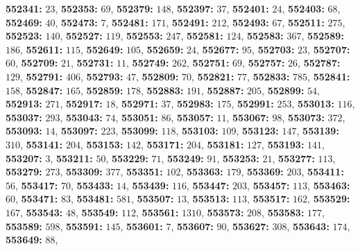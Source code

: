 \textsf{\bfseries 552341:} $23$, \textsf{\bfseries 552353:} $69$, \textsf{\bfseries 552379:} $148$, \textsf{\bfseries 552397:} $37$, \textsf{\bfseries 552401:} $24$, \textsf{\bfseries 552403:} $68$, \textsf{\bfseries 552469:} $40$, \textsf{\bfseries 552473:} $7$, \textsf{\bfseries 552481:} $171$, \textsf{\bfseries 552491:} $212$, \textsf{\bfseries 552493:} $67$, \textsf{\bfseries 552511:} $275$, \textsf{\bfseries 552523:} $140$, \textsf{\bfseries 552527:} $119$, \textsf{\bfseries 552553:} $247$, \textsf{\bfseries 552581:} $124$, \textsf{\bfseries 552583:} $367$, \textsf{\bfseries 552589:} $186$, \textsf{\bfseries 552611:} $115$, \textsf{\bfseries 552649:} $105$, \textsf{\bfseries 552659:} $24$, \textsf{\bfseries 552677:} $95$, \textsf{\bfseries 552703:} $23$, \textsf{\bfseries 552707:} $60$, \textsf{\bfseries 552709:} $21$, \textsf{\bfseries 552731:} $11$, \textsf{\bfseries 552749:} $262$, \textsf{\bfseries 552751:} $69$, \textsf{\bfseries 552757:} $26$, \textsf{\bfseries 552787:} $129$, \textsf{\bfseries 552791:} $406$, \textsf{\bfseries 552793:} $47$, \textsf{\bfseries 552809:} $70$, \textsf{\bfseries 552821:} $77$, \textsf{\bfseries 552833:} $785$, \textsf{\bfseries 552841:} $158$, \textsf{\bfseries 552847:} $165$, \textsf{\bfseries 552859:} $178$, \textsf{\bfseries 552883:} $191$, \textsf{\bfseries 552887:} $205$, \textsf{\bfseries 552899:} $54$, \textsf{\bfseries 552913:} $271$, \textsf{\bfseries 552917:} $18$, \textsf{\bfseries 552971:} $37$, \textsf{\bfseries 552983:} $175$, \textsf{\bfseries 552991:} $253$, \textsf{\bfseries 553013:} $116$, \textsf{\bfseries 553037:} $293$, \textsf{\bfseries 553043:} $74$, \textsf{\bfseries 553051:} $86$, \textsf{\bfseries 553057:} $11$, \textsf{\bfseries 553067:} $98$, \textsf{\bfseries 553073:} $372$, \textsf{\bfseries 553093:} $14$, \textsf{\bfseries 553097:} $223$, \textsf{\bfseries 553099:} $118$, \textsf{\bfseries 553103:} $109$, \textsf{\bfseries 553123:} $147$, \textsf{\bfseries 553139:} $310$, \textsf{\bfseries 553141:} $204$, \textsf{\bfseries 553153:} $142$, \textsf{\bfseries 553171:} $204$, \textsf{\bfseries 553181:} $127$, \textsf{\bfseries 553193:} $141$, \textsf{\bfseries 553207:} $3$, \textsf{\bfseries 553211:} $50$, \textsf{\bfseries 553229:} $71$, \textsf{\bfseries 553249:} $91$, \textsf{\bfseries 553253:} $21$, \textsf{\bfseries 553277:} $113$, \textsf{\bfseries 553279:} $273$, \textsf{\bfseries 553309:} $377$, \textsf{\bfseries 553351:} $102$, \textsf{\bfseries 553363:} $179$, \textsf{\bfseries 553369:} $203$, \textsf{\bfseries 553411:} $56$, \textsf{\bfseries 553417:} $70$, \textsf{\bfseries 553433:} $14$, \textsf{\bfseries 553439:} $116$, \textsf{\bfseries 553447:} $203$, \textsf{\bfseries 553457:} $113$, \textsf{\bfseries 553463:} $60$, \textsf{\bfseries 553471:} $83$, \textsf{\bfseries 553481:} $581$, \textsf{\bfseries 553507:} $13$, \textsf{\bfseries 553513:} $113$, \textsf{\bfseries 553517:} $162$, \textsf{\bfseries 553529:} $167$, \textsf{\bfseries 553543:} $48$, \textsf{\bfseries 553549:} $112$, \textsf{\bfseries 553561:} $1310$, \textsf{\bfseries 553573:} $208$, \textsf{\bfseries 553583:} $177$, \textsf{\bfseries 553589:} $598$, \textsf{\bfseries 553591:} $145$, \textsf{\bfseries 553601:} $7$, \textsf{\bfseries 553607:} $90$, \textsf{\bfseries 553627:} $308$, \textsf{\bfseries 553643:} $174$, \textsf{\bfseries 553649:} $88$, 

